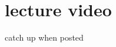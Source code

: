 \documentclass[a4paper]{article}
\begin{document}
\section{lecture video} %
catch up when posted
\end{document}
